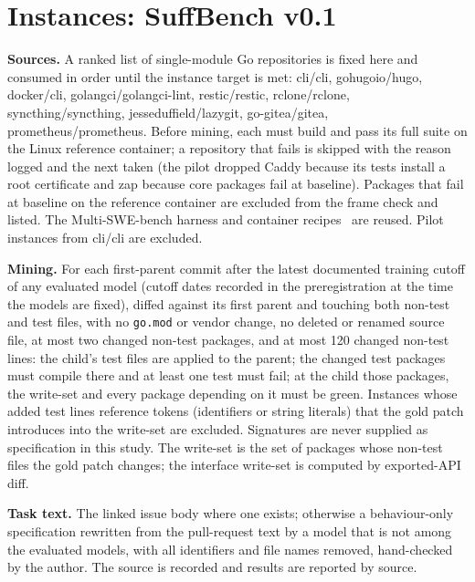 \documentclass[10pt,conference]{IEEEtran}
\begin{document}
\section{Instances: SuffBench v0.1}

\textbf{Sources.} A ranked list of single-module Go repositories is fixed here and consumed in order until the instance target is met: cli/cli, gohugoio/hugo, docker/cli, golangci/golangci-lint, restic/restic, rclone/rclone, syncthing/syncthing, jesseduffield/lazygit, go-gitea/gitea, prometheus/prometheus. Before mining, each must build and pass its full suite on the Linux reference container; a repository that fails is skipped with the reason logged and the next taken (the pilot dropped Caddy because its tests install a root certificate and zap because core packages fail at baseline). Packages that fail at baseline on the reference container are excluded from the frame check and listed. The Multi-SWE-bench harness and container recipes~\cite{zan2025multiswebench} are reused. Pilot instances from cli/cli are excluded.

\textbf{Mining.} For each first-parent commit after the latest documented training cutoff of any evaluated model (cutoff dates recorded in the preregistration at the time the models are fixed), diffed against its first parent and touching both non-test and test files, with no \texttt{go.mod} or vendor change, no deleted or renamed source file, at most two changed non-test packages, and at most 120 changed non-test lines: the child's test files are applied to the parent; the changed test packages must compile there and at least one test must fail; at the child those packages, the write-set and every package depending on it must be green. Instances whose added test lines reference tokens (identifiers or string literals) that the gold patch introduces into the write-set are excluded. Signatures are never supplied as specification in this study. The write-set is the set of packages whose non-test files the gold patch changes; the interface write-set is computed by exported-API diff.

\textbf{Task text.} The linked issue body where one exists; otherwise a behaviour-only specification rewritten from the pull-request text by a model that is not among the evaluated models, with all identifiers and file names removed, hand-checked by the author. The source is recorded and results are reported by source.
\end{document}
